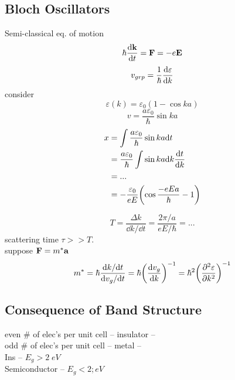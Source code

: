 \documentclass[UTF8]{ctexart} %
\numberwithin{equation}{section}
\begin{document}
\subsection{Bloch Oscillators}
Semi-classical eq. of motion
\begin{equation}\label{key}
\hbar\dv{\vb{k}}{t} = \vb{F} = -e\vb{E}
\end{equation}
\begin{equation}\label{key}
v_{grp} = \dfrac{1}{\hbar}\dv{\varepsilon}{k}
\end{equation}
consider
\begin{equation}\label{key}
\varepsilon(k) = \varepsilon_0(1 - \cos ka)
\end{equation}
\begin{equation}\label{key}
v = \dfrac{a\varepsilon_0}{\hbar}\sin ka
\end{equation}
\begin{equation}\label{key}
\begin{aligned}
x &= \int \dfrac{a\varepsilon_0}{\hbar}\sin ka \dd t\\
&= \dfrac{a\varepsilon_0}{\hbar} \int \sin ka \dd k \dv{t}{k}\\
&= ...\\
&= -\dfrac{\varepsilon_0}{eE}\qty(\cos\dfrac{-eEa}{\hbar} - 1)
\end{aligned}
\end{equation}

\begin{equation}\label{key}
T = \dfrac{\Delta k}{\dd k/\dd t} = \dfrac{2\pi/a}{eE/\hbar} = ...
\end{equation}
scattering time $ \tau >> T $. \\

suppose $ \vb{F} = m^\ast \vb{a} $
\begin{equation}\label{key}
m^\ast = \hbar\dfrac{\dd k/\dd t}{\dd v_g/\dd t} = \hbar \qty(\dv{v_g}{k})^{-1} = \hbar^2 \qty(\pdv[2]{\varepsilon}{k})^{-1}
\end{equation}


\subsection{Consequence of Band Structure}
even \# of elec's per unit cell -- insulator -- \\
odd \# of elec's per unit cell -- metal -- \\
Ins -- $ E_g > 2\; eV $\\
Semiconductor -- $ E_g < 2; eV $\\
\end{document}
